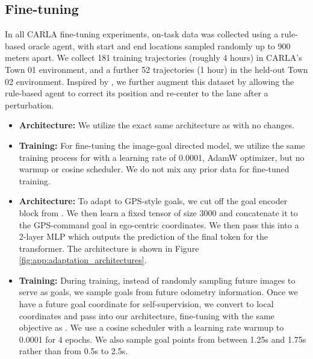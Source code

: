 \subsection{Fine-tuning \ModelName}
\label{sec:app:implementation_finetuning}
In all CARLA fine-tuning experiments, on-task data was collected using a rule-based oracle agent, with start and end locations sampled randomly up to 900 meters apart. We collect 181 training trajectories (roughly 4 hours) in CARLA's Town 01 environment, and a further 52 trajectories (1 hour) in the held-out Town 02 environment. Inspired by \citet{Codevilla2017CIL}, we further augment this dataset by allowing the rule-based agent to correct its position and re-center to the lane after a perturbation.

\begin{itemize}
    \item \textbf{Architecture:} We utilize the exact same architecture as \ModelName with no changes. 
    \item \textbf{Training:} For fine-tuning the image-goal directed model, we utilize the same training process for \ModelName with a learning rate of 0.0001, AdamW optimizer, but no warmup or cosine scheduler. We do not mix any prior data for fine-tuned training.
\end{itemize}

\begin{itemize}
    \item \textbf{Architecture:} To adapt to GPS-style goals, we cut off the goal encoder block from \ModelName. We then learn a fixed tensor of size 3000 and concatenate it to the GPS-command goal in ego-centric coordinates. We then pass this into a 2-layer MLP which outputs the prediction of the final token for the transformer. The architecture is shown in Figure \ref{fig:app:adaptation_architectures}.
    \item \textbf{Training:} During training, instead of randomly sampling future images to serve as goals, we sample goals from future odometry information. Once we have a future goal coordinate for self-supervision, we convert to local coordinates and pass into our architecture, fine-tuning with the same objective as \ModelName.  We use a cosine scheduler with a learning rate warmup to 0.0001 for 4 epochs. We also sample goal points from between 1.25s and 1.75s rather than from 0.5s to 2.5s.
\end{itemize}

